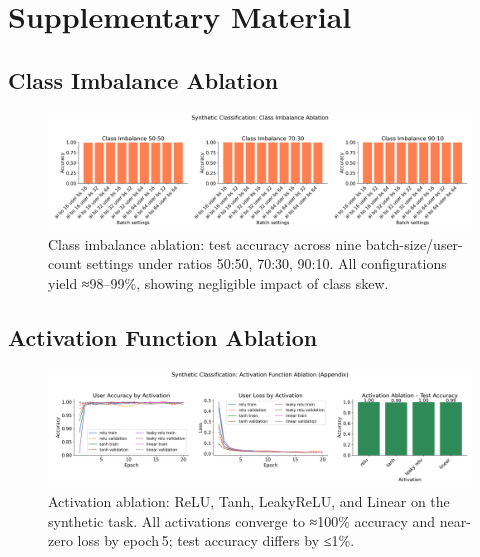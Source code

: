 \documentclass{article} %
\begin{document}



\appendix
\section*{Supplementary Material}
\subsection{Class Imbalance Ablation}
\begin{figure}[h]
  \centering
  \includegraphics[width=\textwidth]{class_imbalance_ablation.png}
  \caption{Class imbalance ablation: test accuracy across nine batch-size/user-count settings under ratios 50:50, 70:30, 90:10. All configurations yield ≈98–99\%, showing negligible impact of class skew.}
  \label{fig:imbalance}
\end{figure}

\subsection{Activation Function Ablation}
\begin{figure}[h]
  \centering
  \includegraphics[width=\textwidth]{activation_ablation_appendix.png}
  \caption{Activation ablation: ReLU, Tanh, LeakyReLU, and Linear on the synthetic task. All activations converge to ≈100\% accuracy and near-zero loss by epoch 5; test accuracy differs by ≤1\%.}
  \label{fig:activation}
\end{figure}
\end{document}
